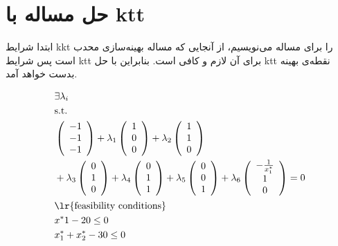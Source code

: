\documentclass[paper=a4, fontsize=11pt]{article}
\numberwithin{equation}{section} %
\numberwithin{figure}{section} %
\numberwithin{table}{section} %
\begin{document}
\section{حل مساله با ktt}
\indent \par
	ابتدا شرایط kkt را برای مساله می‌نویسیم، از آنجایی که مساله بهینه‌سازی محدب است پس شرایط ktt برای آن لازم و کافی است.
	بنابراین با حل ktt نقطه‌ی بهینه بدست خواهد آمد.

\begin{equation}
	\begin{aligned}
		& \exists \lambda_i \\
		& \text{s.t.} \\
		& \left( \begin{array}{c} -1 \\ -1 \\ -1 \end{array} \right)
		+ \lambda_1 \left( \begin{array}{c} 1 \\ 0 \\ 0 \end{array} \right)
		+ \lambda_2 \left( \begin{array}{c} 1 \\ 1 \\ 0 \end{array} \right)\\
		& + \lambda_3 \left( \begin{array}{c} 0 \\ 1 \\ 0 \end{array} \right)
		+ \lambda_4 \left( \begin{array}{c} 0 \\ 1 \\ 1 \end{array} \right)
		+ \lambda_5 \left( \begin{array}{c} 0 \\ 0 \\ 1 \end{array} \right)
		+ \lambda_6 \left( \begin{array}{c} -\frac{1}{x^*_1} \\ 1 \\ 0 \end{array} \right)
		= 0 \\
		& \text{\lr{feasibility conditions}} \\
		& x^*1 - 20 \le 0\\
		& x^*_1 + x^*_2 - 30 \le 0 \\

\end{aligned}
\end{equation}
\end{document}
